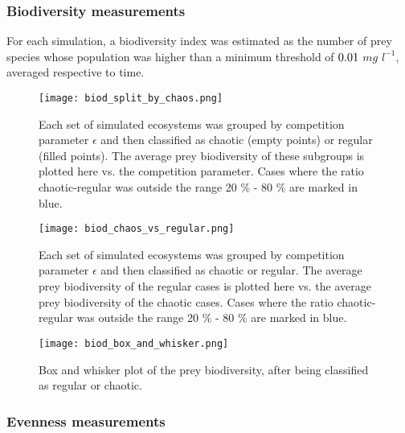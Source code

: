 \subsubsection{Biodiversity measurements}
\label{subsubsec:BiodiversityFigs}

For each simulation, a biodiversity index was estimated as the number of prey species whose population was higher than a minimum threshold of $0.01$ $mg$ $l^{-1}$, averaged respective to time.

\begin{figure}[H]
	\begin{center}
		\texttt{[image: biod\_split\_by\_chaos.png]}
	\end{center}
	\caption{Each set of simulated ecosystems was grouped by competition parameter $\epsilon$ and then classified as chaotic (empty points) or regular (filled points). The average prey biodiversity of these subgroups is plotted here vs. the competition parameter. Cases where the ratio chaotic-regular was outside the range 20 \% - 80 \% are marked in blue.}
	\label{fig:BiodSplitByChaos}
\end{figure}

\begin{figure}[H]
	\begin{center}
		\texttt{[image: biod\_chaos\_vs\_regular.png]}
	\end{center}
	\caption{Each set of simulated ecosystems was grouped by competition parameter $\epsilon$ and then classified as chaotic or regular. The average prey biodiversity of the regular cases is plotted here vs. the average prey biodiversity of the chaotic cases. Cases where the ratio chaotic-regular was outside the range 20 \% - 80 \% are marked in blue.}
	\label{fig:BiodChaosVsRegular}
\end{figure}

\begin{figure}[H]
	\begin{center}
		\texttt{[image: biod\_box\_and\_whisker.png]}
	\end{center}
	\caption{Box and whisker plot of the prey biodiversity, after being classified as regular or chaotic.}
	\label{fig:BiodBoxAndWhisker}
\end{figure}

\subsubsection{Evenness measurements}
\label{subsubsec:EvennessFigs}

